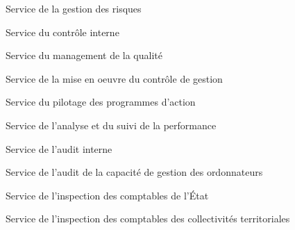 \documentclass[a4paper,12pt,oneside]{report}
\begin{document}
{
\begin{svc}
\item Service de la gestion des risques
\item Service du contrôle interne
\item Service du management de la qualité
\end{svc}
\begin{svc}
\item Service de la mise en oeuvre du contrôle de gestion
\item Service du pilotage des programmes d'action
\item Service de l'analyse et du suivi de la performance
\end{svc}
\begin{svc}
\item Service de l'audit interne
\item Service de l'audit de la capacité de gestion des ordonnateurs
\item Service de l'inspection des comptables de l'État
\item Service de l'inspection des comptables des collectivités territoriales
\end{svc}

}
\end{document}
